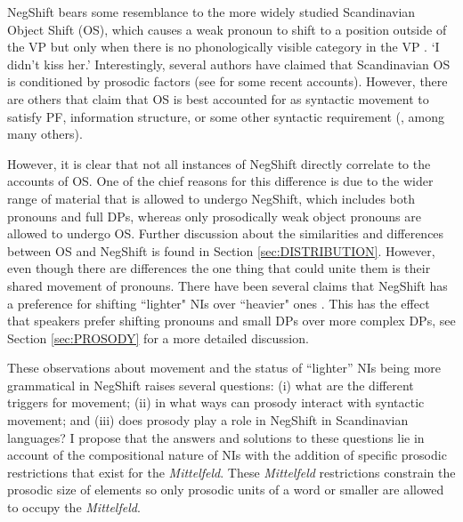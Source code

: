 \documentclass[12pt, letterpaper]{article}
\begin{document}
NegShift bears some resemblance to the more widely studied Scandinavian Object Shift (OS), which causes a weak pronoun to shift to a position outside of the VP but only when there is no phonologically visible category in  the VP \citep{holmbergWordOrderSyntactic1986,holmbergRemarksHolmbergGeneralization1999}.
	 
	\glt `I didn't kiss her.'   
	\z  
Interestingly, several authors have claimed that Scandinavian OS is conditioned by prosodic factors (see \cite{erteschik-shirSoundPatternsSyntax2005,erteschik-shirScandinavianObjectShift2017,erteschik-shirVariationMainlandScandinavian2020,brinkerhoffMATCHINGPhrasesNorwegian2021} for some recent accounts). However, there are others that claim that OS is best accounted for as syntactic movement to satisfy PF, information structure, or some other syntactic requirement (\cite{holmbergRemarksHolmbergGeneralization1999,thrainssonObjectShiftScrambling2001,foxCyclicLinearizationSyntactic2005,bentzenObjectShiftSpoken2013}, among many others). 

However, it is clear that not all instances of NegShift directly correlate to the accounts of OS. One of the chief reasons for this difference is due to the wider range of material that is allowed to undergo NegShift, which includes both pronouns and full DPs, whereas only prosodically weak object pronouns are allowed to undergo OS. Further discussion about the similarities and differences between OS and NegShift is found in Section \ref{sec:DISTRIBUTION}. However, even though there are differences the one thing that could unite them is their shared movement of pronouns. There have been several claims that NegShift has a preference for shifting ``lighter" NIs over ``heavier" ones \citep{christensenInterfacesNegationSyntax2005,penkaNegativeIndefinites2011}. This has the effect that speakers prefer shifting pronouns and small DPs over more complex DPs, see Section \ref{sec:PROSODY} for a more detailed discussion. 

These observations about movement and the status of ``lighter'' NIs being more grammatical in NegShift raises several questions: (i) what are the different triggers for movement; (ii) in what ways can prosody interact with syntactic movement; and (iii) does prosody play a role in NegShift in Scandinavian languages? I propose that the answers and solutions to these questions lie in  account of the compositional nature of NIs with the addition of specific prosodic restrictions that exist for the \emph{Mittelfeld}. These \emph{Mittelfeld} restrictions constrain the prosodic size of elements so only prosodic units of a word or smaller are allowed to occupy the \emph{Mittelfeld}. 
\end{document}
